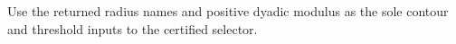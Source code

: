 Use the returned radius names and positive dyadic modulus as the sole contour and threshold inputs to the certified selector.